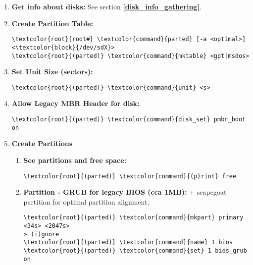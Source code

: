 \documentclass[10pt, a4paper, onecolumn, openany]{book} %
\begin{document}
\begin{enumerate}

    \item \textbf{Get info about disks:}
\newline See section \underline{\textbf{\ref{disk_info_gathering}}}.

    \item \textbf{Create Partition Table:}
\begin{Verbatim}[commandchars=\\\{\}]
\textcolor{root}{root#} \textcolor{command}{parted} [-a <optimal>] <\textcolor{block}{/dev/sdX}>
\textcolor{root}{(parted)} \textcolor{command}{mktable} <gpt|msdos>
\end{Verbatim}

    \item \textbf{Set Unit Size (sectors):}
\begin{Verbatim}[commandchars=\\\{\}]
\textcolor{root}{(parted)} \textcolor{command}{unit} <s>
\end{Verbatim}

    \item \textbf{Allow Legacy MBR Header for disk:}
\begin{Verbatim}[commandchars=\\\{\}]
\textcolor{root}{(parted)} \textcolor{command}{disk_set} pmbr_boot on
\end{Verbatim}

    \item \textbf{Create Partitions}
    \begin{enumerate}
        \item \textbf{See partitions and free space:}
\begin{Verbatim}[commandchars=\\\{\}]
\textcolor{root}{(parted)} \textcolor{command}{(p)rint} free 
\end{Verbatim}        

        \item \textbf{Partition - GRUB for legacy BIOS (cca 1MB):}
\newline + scapegoat partition for optimal partition alignment.
\begin{Verbatim}[commandchars=\\\{\}]
\textcolor{root}{(parted)} \textcolor{command}{mkpart} primary <34s> <2047s>
> (i)gnore
\textcolor{root}{(parted)} \textcolor{command}{name} 1 bios
\textcolor{root}{(parted)} \textcolor{command}{set} 1 bios_grub on
\end{Verbatim}


\end{enumerate}
\end{enumerate}
\end{document}
